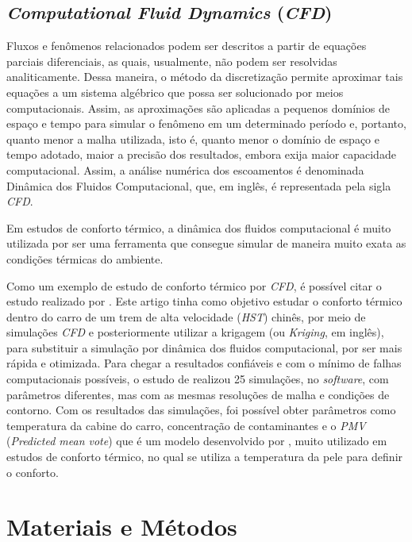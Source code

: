 \documentclass[acronym,symbols,table]{fei}
\begin{document}
\section{\textit{Computational Fluid Dynamics} (\textit{CFD})}

Fluxos e fenômenos relacionados podem ser descritos a partir de equações parciais diferenciais, as quais, usualmente, não podem ser resolvidas analiticamente. Dessa maneira, o método da discretização permite aproximar tais equações a um sistema algébrico que possa ser solucionado por meios computacionais. Assim, as aproximações são aplicadas a pequenos domínios de espaço e tempo \cite{peric2002computational} para simular o fenômeno em um determinado período e, portanto, quanto menor a malha utilizada, isto é, quanto menor o domínio de espaço e tempo adotado, maior a precisão dos resultados, embora exija maior capacidade computacional. Assim, a análise numérica dos escoamentos é denominada Dinâmica dos Fluidos Computacional, que, em inglês, é representada pela sigla \textit{CFD}. 

Em estudos de conforto térmico, a dinâmica dos fluidos computacional é muito utilizada por ser uma ferramenta que consegue simular de maneira muito exata as condições térmicas do ambiente.   

Como um exemplo de estudo de conforto térmico por \textit{CFD}, é possível citar o estudo realizado por \textcite{li2019multi}. Este artigo tinha como objetivo estudar o conforto térmico dentro do carro de um trem de alta velocidade (\textit{HST}) chinês, por meio de simulações \textit{CFD} e posteriormente utilizar a krigagem (ou \textit{Kriging}, em inglês), para substituir a simulação por dinâmica dos fluidos computacional, por ser mais rápida e otimizada. Para chegar a resultados confiáveis e com o mínimo de falhas computacionais possíveis, o estudo de \textcite{li2019multi} realizou 25 simulações, no \textit{software}, com parâmetros diferentes, mas com as mesmas resoluções de malha e condições de contorno. Com os resultados das simulações, foi possível obter parâmetros como temperatura da cabine do carro, concentração de contaminantes e o \textit{PMV} (\textit{Predicted mean vote}) que é um modelo desenvolvido por \textcite{fanger1970thermal}, muito utilizado em estudos de conforto térmico, no qual se utiliza a temperatura da pele para definir o conforto.

\chapter{Materiais e Métodos}
\end{document}
